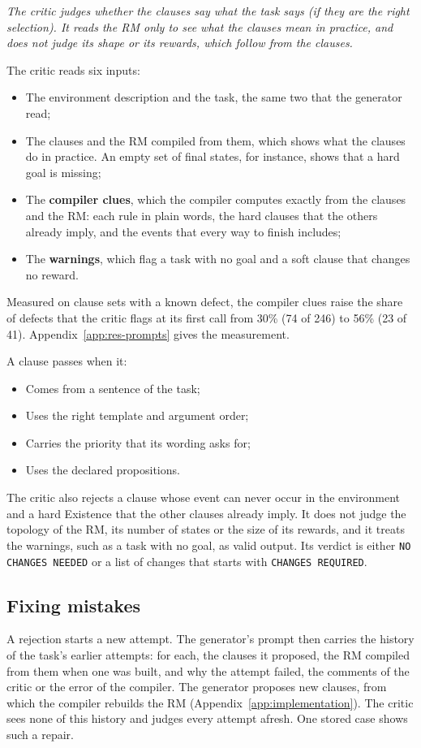 \documentclass[11pt,english,listoffigures,listoftables]{tfgetsinf}
\newcommand{\keyidea}[1]{\par\smallskip\noindent\hspace*{0.6em}{\color{gray!55}\vrule width 1.5pt}\hspace{8pt}\parbox[t]{\dimexpr\linewidth-0.6em-9.5pt\relax}{\itshape #1}\par\smallskip}  %
\begin{document}
\keyidea{The critic judges whether the clauses say what the task says (if they are the right selection). It reads the RM only to see what the clauses mean in practice, and does not judge its shape or its rewards, which follow from the clauses.}
\noindent The critic reads six inputs:
\begin{itemize}
    \item The environment description and the task, the same two that the generator read;
    \item The clauses and the RM compiled from them, which shows what the clauses do in practice. An empty set of final states, for instance, shows that a hard goal is missing;
    \item The \textbf{compiler clues}, which the compiler computes exactly from the clauses and the RM: each rule in plain words, the hard clauses that the others already imply, and the events that every way to finish includes;
    \item The \textbf{warnings}, which flag a task with no goal and a soft clause that changes no reward.
\end{itemize}

\noindent Measured on clause sets with a known defect, the compiler clues raise the share of defects that the critic flags at its first call from 30\% (74 of 246) to 56\% (23 of 41). Appendix~\ref{app:res-prompts} gives the measurement.

\noindent A clause passes when it:
\begin{itemize}
    \item Comes from a sentence of the task;
    \item Uses the right template and argument order;
    \item Carries the priority that its wording asks for;
    \item Uses the declared propositions.
\end{itemize}

\noindent The critic also rejects a clause whose event can never occur in the environment and a hard Existence that the other clauses already imply. It does not judge the topology of the RM, its number of states or the size of its rewards, and it treats the warnings, such as a task with no goal, as valid output. Its verdict is either \texttt{NO CHANGES NEEDED} or a list of changes that starts with \texttt{CHANGES REQUIRED}.

\subsection{Fixing mistakes}
A rejection starts a new attempt. The generator's prompt then carries the history of the task's earlier attempts: for each, the clauses it proposed, the RM compiled from them when one was built, and why the attempt failed, the comments of the critic or the error of the compiler. The generator proposes new clauses, from which the compiler rebuilds the RM (Appendix~\ref{app:implementation}). The critic sees none of this history and judges every attempt afresh. One stored case shows such a repair.
\end{document}

